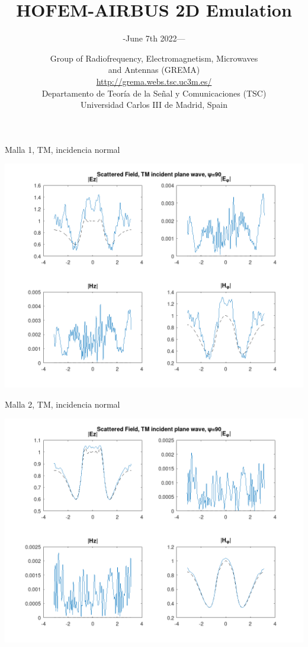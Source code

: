 \documentclass[smaller,xcolor=table,dvipsnames]{beamer}
\title[HOFEM-AIRBUS(v{\rcsInfoRevision})]{HOFEM-AIRBUS 2D Emulation}
\author[]{-June 7th 2022---}
\author{}
\date[]{\small{%
    Group of Radiofrequency, Electromagnetism, Microwaves \\ and Antennas (GREMA) \\    \url{http://grema.webs.tsc.uc3m.es/}
 \\[0.8\baselineskip]
    Departamento de Teoría de la Señal y Comunicaciones (TSC) \\
    Universidad Carlos III de Madrid, Spain \\
  }}
\institute{Contact: Luis Emilio García-Castillo
  \url{legcasti@ing.uc3m.es}, Adrián Amor \url{aamor@ing.uc3m.es}, Sergio Llorente \url{sollorent@ing.uc3m.es}}
\begin{document}
\begin{frame}
  \titlepage
\end{frame}




\begin{frame}{Malla 1, TM, incidencia normal}

\includegraphics[width=0.95\linewidth]{pec_y_malla_gorda_90_TM/NF.png}
  
\end{frame}
  

\begin{frame}{Malla 2, TM, incidencia normal}

\includegraphics[width=0.95\linewidth]{pec_y_malla_fina_90_TM/NF.png}
  
\end{frame}
\end{document}
